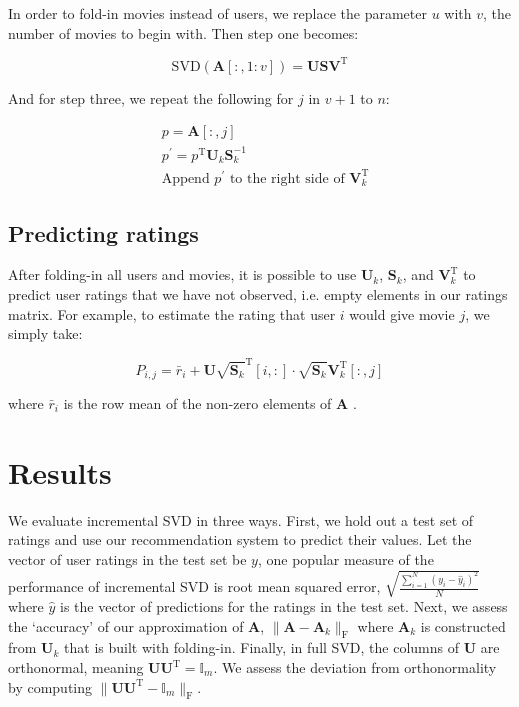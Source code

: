 \documentclass{article} %
\newcommand{\A}{\mathbf{A}}
\newcommand{\T}{\textrm{T}}
\begin{document}
In order to fold-in movies instead of users, we replace the parameter $u$ with $v$, the number of movies to begin with. Then step one becomes:

$$\textrm{SVD}(\A[:,1:v]) = \mathbf{U}\mathbf{S}\mathbf{V}^{\T}$$

And for step three, we repeat the following for $j$ in $v+1$ to $n$:

\begin{align*}
&p = \A[:,j]\\
&p^{\prime} = p^{\T}\mathbf{U}_k\mathbf{S}_k^{-1}\\
&\textrm{Append $p^{\prime}$ to the right side of $\mathbf{V}_k^{\T}$}
\end{align*}

\subsection{Predicting ratings}

After folding-in all users and movies, it is possible to use $\mathbf{U}_k$, $\mathbf{S}_k$, and $\mathbf{V}_k^{\T}$ to predict user ratings that we have not observed, i.e. empty elements in our ratings matrix.
For example, to estimate the rating that user $i$ would give movie $j$, we simply take:

$$P_{i,j} = \bar{r}_i + \mathbf{U}\sqrt{\mathbf{S}_k}^{\T}[i,:]
\cdot \sqrt{\mathbf{S}_k}\mathbf{V}_k^{\T}[:,j]$$

where $\bar{r}_i$ is the row mean of the non-zero elements of $\A$ \citep{sarwar2002}.

\section{Results}

We evaluate incremental SVD in three ways.
First, we hold out a test set of ratings and use our recommendation system to predict their values.
Let the vector of user ratings in the test set be $y$, one popular measure of the performance of incremental SVD is root mean squared error, $\sqrt{\frac{\sum_{i=1}^N \left(y_i - \hat{y}_i\right)^2}{N}}$ where $\hat{y}$ is the vector of predictions for the ratings in the test set.
Next, we assess the `accuracy' of our approximation of $\A$, $\|\A - \A_k\|_{\textrm{F}}$ where $\A_k$ is constructed from $\mathbf{U}_k$ that is built with folding-in.
Finally, in full SVD, the columns of $\mathbf{U}$ are orthonormal, meaning $\mathbf{U}\mathbf{U}^{\T} = \mathbb{I}_m$.
We assess the deviation from orthonormality by computing $\|\mathbf{U}\mathbf{U}^{\T} - \mathbb{I}_m\|_{\textrm{F}}$.
\end{document}
